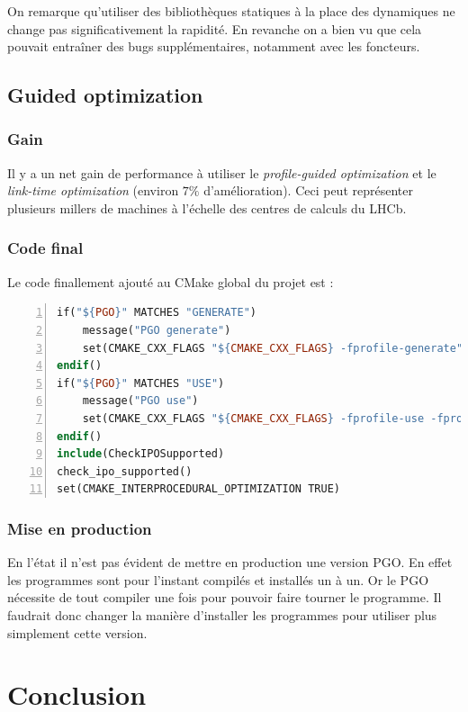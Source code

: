 \documentclass[a4paper]{report}
\begin{document}
On remarque qu'utiliser des bibliothèques statiques à la place des dynamiques ne change pas significativement la rapidité.
En revanche on a bien vu que cela pouvait entraîner des bugs supplémentaires, notamment avec les foncteurs.

\section{Guided optimization}
\subsection{Gain}
Il y a un net gain de performance à utiliser le \emph{profile-guided optimization} et le \emph{link-time optimization} (environ $7\%$ d'amélioration).
Ceci peut représenter plusieurs millers de machines à l'échelle des centres de calculs du LHCb.

\subsection{Code final}
Le code finallement ajouté au CMake global du projet est :
\begin{lstlisting}[language=make,breaklines=true,numbers=left]
if("${PGO}" MATCHES "GENERATE")
    message("PGO generate")
    set(CMAKE_CXX_FLAGS "${CMAKE_CXX_FLAGS} -fprofile-generate")
endif()
if("${PGO}" MATCHES "USE")
    message("PGO use")
    set(CMAKE_CXX_FLAGS "${CMAKE_CXX_FLAGS} -fprofile-use -fprofile-correction")
endif()
include(CheckIPOSupported)
check_ipo_supported()
set(CMAKE_INTERPROCEDURAL_OPTIMIZATION TRUE)
            \end{lstlisting}

\subsection{Mise en production}
En l'état il n'est pas évident de mettre en production une version PGO.
En effet les programmes sont pour l'instant compilés et installés un à un.
Or le PGO nécessite de tout compiler une fois pour pouvoir faire tourner le programme.
Il faudrait donc changer la manière d'installer les programmes pour utiliser plus simplement cette version.

\chapter*{Conclusion}


\printbibliography
\end{document}
